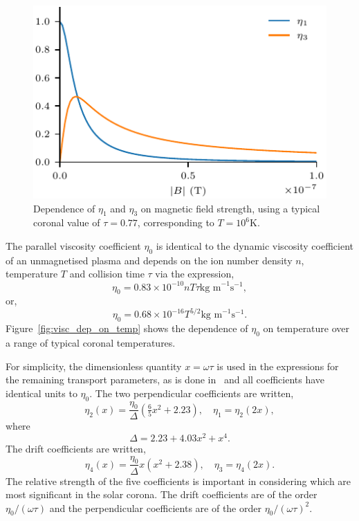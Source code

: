 \begin{figure}[t]
  \centering
  \includegraphics[width=0.5\linewidth]{brag_coeffs.pdf}
  \caption{Dependence of $\eta_1$ and $\eta_3$ on magnetic field strength, using a typical coronal value of $\tau = 0.77$, corresponding to $T=10^6$K.}
\label{fig:visc_dep}%
\end{figure}

The parallel viscosity coefficient $\eta_0$ is identical to the dynamic viscosity coefficient of an unmagnetised plasma and depends on the ion number density $n$, temperature $T$ and collision time $\tau$ via the expression,
\begin{equation}
  \label{eq:parallel_visc_coeff}
  \eta_0 = 0.83 \times 10^{-10} n T \tau \text{kg m}^{-1}\text{s}^{-1},
\end{equation}
or,
\begin{equation}
  \label{eq:parallel_visc_coeff2}
  \eta_0 = 0.68 \times 10^{-16} T^{5/2} \text{kg m}^{-1}\text{s}^{-1}.
\end{equation}
Figure~\ref{fig:visc_dep_on_temp} shows the dependence of $\eta_0$ on temperature over a range of typical coronal temperatures.

For simplicity, the dimensionless quantity $x = \omega \tau$ is used in the expressions for the remaining transport parameters, as is done in~\cite{braginskiiTransportProcessesPlasma1965} and all coefficients have identical units to $\eta_0$. The two perpendicular coefficients are written,
\begin{equation}
  \label{eq:perp_visc_coeff}
  \eta_2(x) = \frac{\eta_0}{\Delta} \left( \tfrac{6}{5} x^2 + 2.23 \right), \quad \eta_1 = \eta_2(2x),
\end{equation}
where
\begin{equation}
  \label{eq:delta}
\Delta = 2.23 + 4.03x^2 + x^4.
\end{equation}
The drift coefficients are written,
\begin{equation}
  \label{eq:drift_visc_coeff}
  \eta_4(x) = \frac{\eta_0}{\Delta} x \left( x^2 + 2.38 \right), \quad \eta_3 = \eta_4(2x).
\end{equation}
The relative strength of the five coefficients is important in considering which are most significant in the solar corona. The drift coefficients are of the order $\eta_0/(\omega \tau)$ and the perpendicular coefficients are of the order $\eta_0/(\omega \tau)^2$.

